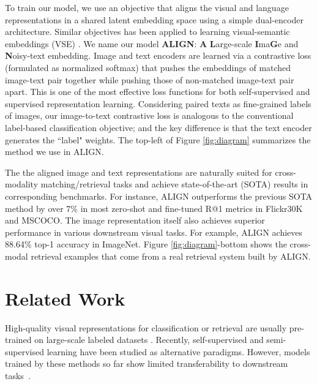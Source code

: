 \documentclass{article}
\begin{document}
To train our model, we use an objective that aligns the visual and language representations in a shared latent embedding space using a simple dual-encoder architecture. Similar objectives has been applied to learning visual-semantic embeddings (VSE) \cite{frome:devise, faghri:vse++}. We name our model \textbf{ALIGN}: \textbf{A} \textbf{L}arge-scale \textbf{I}ma\textbf{G}e and \textbf{N}oisy-text embedding. Image and text encoders are learned via a contrastive loss (formulated as normalized softmax) that pushes the embeddings of matched image-text pair together while pushing those of non-matched image-text pair apart. This is one of the most effective loss functions for both self-supervised \cite{chen:simclr} and supervised \cite{zhai:norm_softmax, musgrave:metric_check} representation learning. Considering paired texts as fine-grained labels of images, our image-to-text contrastive loss is analogous to the conventional label-based classification objective; and the key difference is that the text encoder generates the ``label" weights. The top-left of Figure \ref{fig:diagram} summarizes the method we use in ALIGN.

The the aligned image and text representations are naturally suited for cross-modality matching/retrieval tasks and achieve state-of-the-art (SOTA) results in corresponding benchmarks. For instance, ALIGN outperforms the previous SOTA method by over 7\% in most zero-shot and fine-tuned R@1 metrics in Flickr30K and MSCOCO. The image representation itself also achieves superior performance in various downstream visual tasks. For example, ALIGN achieves 88.64\% top-1 accuracy in ImageNet.  Figure \ref{fig:diagram}-bottom shows the cross-modal retrieval examples that come from a real retrieval system built by ALIGN.

\vspace{-2mm}
\section{Related Work}

High-quality visual representations for classification or retrieval are usually pre-trained on large-scale labeled datasets \cite{mahajan:wsl, kolensnikov:bit, dosovitskiy:vit, juan:graphrise}. Recently, self-supervised \citep{henaff:cpc, chen:simclr,he:moco, misra:pirl, li:pcl, grill:byol, caron:swav} and semi-supervised learning \citep{yalniz2019billion, xie:noisy_student, pham:mpl} have been studied as alternative paradigms. However, models trained by these methods so far show limited transferability to downstream tasks~\cite{zoph2020rethinking}.
\end{document}
